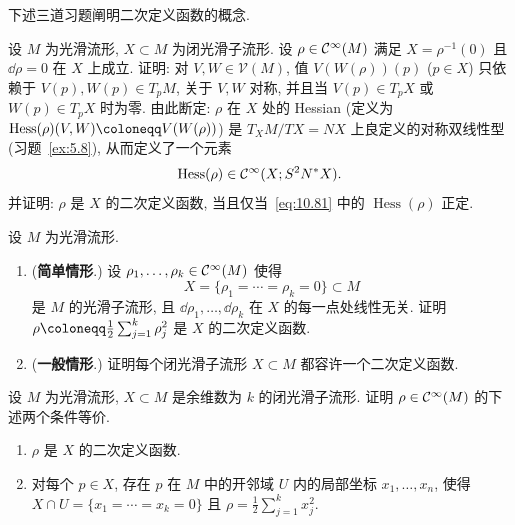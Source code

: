 下述三道习题阐明二次定义函数的概念.

\begin{exer}[Hessian]\label{ex:10.2}
设 $M$ 为光滑流形, $X \subset M$ 为闭光滑子流形. 设 $\rho \in \mathcal{C}^\infty(M)$ 满足 $X = \rho^{-1}(0)$ 且 $\dd\rho = 0$ 在 $X$ 上成立. 证明: 对 $V, W \in \mathcal{V}(M)$, 值 $V(W(\rho))(p)$ ($p \in X$) 只依赖于 $V(p), W(p) \in T_p M$, 关于 $V, W$ 对称, 并且当 $V(p) \in T_p X$ 或 $W(p) \in T_p X$ 时为零. 由此断定: $\rho$ 在 $X$ 处的 Hessian (定义为 $\operatorname{Hess}(\rho)(V, W) \defeq V(W(\rho))$) 是 $T_X M / TX = NX$ 上良定义的对称双线性型 (习题~\ref{ex:5.8}), 从而定义了一个元素
\begin{equation}\label{eq:10.81}
    \operatorname{Hess}(\rho) \in \mathcal{C}^\infty(X; S^2 N^* X).
\end{equation}
并证明: $\rho$ 是 $X$ 的二次定义函数, 当且仅当~\eqref{eq:10.81} 中的 $\operatorname{Hess}(\rho)$ 正定.
\end{exer}

\begin{exer}\label{ex:10.3}
设 $M$ 为光滑流形.
\begin{enumerate}
    \item (\textbf{简单情形}.) 设 $\rho_1, \ldots, \rho_k \in \mathcal{C}^\infty(M)$ 使得
    \begin{equation}\label{eq:10.82}
        X = \{\rho_1 = \cdots = \rho_k = 0\} \subset M
    \end{equation}
    是 $M$ 的光滑子流形, 且 $\dd\rho_1, \ldots, \dd\rho_k$ 在 $X$ 的每一点处线性无关. 证明 $\rho \defeq \frac{1}{2}\sum_{j=1}^{k}\rho_j^2$ 是 $X$ 的二次定义函数.
    \item (\textbf{一般情形}.) 证明每个闭光滑子流形 $X \subset M$ 都容许一个二次定义函数.
\end{enumerate}
\end{exer}

\begin{exer}[二次定义函数: 结构]\label{ex:10.4}
设 $M$ 为光滑流形, $X \subset M$ 是余维数为 $k$ 的闭光滑子流形. 证明 $\rho \in \mathcal{C}^\infty(M)$ 的下述两个条件等价.
\begin{enumerate}
    \item $\rho$ 是 $X$ 的二次定义函数.
    \item 对每个 $p \in X$, 存在 $p$ 在 $M$ 中的开邻域 $U$ 内的局部坐标 $x_1, \ldots, x_n$, 使得 $X \cap U = \{x_1 = \cdots = x_k = 0\}$ 且 $\rho = \frac{1}{2}\sum_{j=1}^{k} x_j^2$.
\end{enumerate}
\end{exer}

